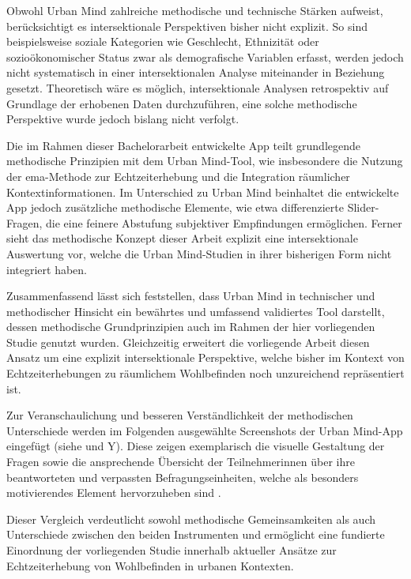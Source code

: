 Obwohl Urban Mind zahlreiche methodische und technische Stärken aufweist, berücksichtigt es intersektionale Perspektiven bisher nicht explizit. So sind beispielsweise soziale Kategorien wie Geschlecht, Ethnizität oder sozioökonomischer Status zwar als demografische Variablen erfasst, werden jedoch nicht systematisch in einer intersektionalen Analyse miteinander in Beziehung gesetzt. Theoretisch wäre es möglich, intersektionale Analysen retrospektiv auf Grundlage der erhobenen Daten durchzuführen, eine solche methodische Perspektive wurde jedoch bislang nicht verfolgt.

Die im Rahmen dieser Bachelorarbeit entwickelte App teilt grundlegende methodische Prinzipien mit dem Urban Mind-Tool, wie insbesondere die Nutzung der \gls{ema}-Methode zur Echtzeiterhebung und die Integration räumlicher Kontextinformationen. Im Unterschied zu Urban Mind beinhaltet die entwickelte App jedoch zusätzliche methodische Elemente, wie etwa differenzierte Slider-Fragen, die eine feinere Abstufung subjektiver Empfindungen ermöglichen. Ferner sieht das methodische Konzept dieser Arbeit explizit eine intersektionale Auswertung vor, welche die Urban Mind-Studien in ihrer bisherigen Form nicht integriert haben.

Zusammenfassend lässt sich feststellen, dass Urban Mind in technischer und methodischer Hinsicht ein bewährtes und umfassend validiertes Tool darstellt, dessen methodische Grundprinzipien auch im Rahmen der hier vorliegenden Studie genutzt wurden. Gleichzeitig erweitert die vorliegende Arbeit diesen Ansatz um eine explizit intersektionale Perspektive, welche bisher im Kontext von Echtzeiterhebungen zu räumlichem Wohlbefinden noch unzureichend repräsentiert ist.

Zur Veranschaulichung und besseren Verständlichkeit der methodischen Unterschiede werden im Folgenden ausgewählte Screenshots der Urban Mind-App eingefügt (siehe  und Y). Diese zeigen exemplarisch die visuelle Gestaltung der Fragen sowie die ansprechende Übersicht der Teilnehmer\:innen über ihre beantworteten und verpassten Befragungseinheiten, welche als besonders motivierendes Element hervorzuheben sind \parencite{bakolisUrbanMindUsing2018}.

Dieser Vergleich verdeutlicht sowohl methodische Gemeinsamkeiten als auch Unterschiede zwischen den beiden Instrumenten und ermöglicht eine fundierte Einordnung der vorliegenden Studie innerhalb aktueller Ansätze zur Echtzeiterhebung von Wohlbefinden in urbanen Kontexten.


